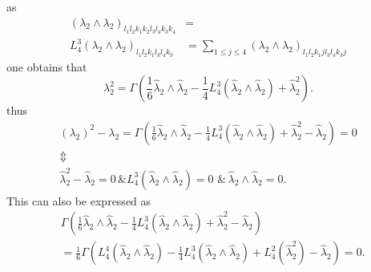 \documentclass[aps,preprint]{revtex4}%
\begin{document}
as
\begin{align}
\left(  \lambda_{2}\wedge\lambda_{2}\right)  _{l_{1}l_{2}k_{1}k_{2}l_{3}%
l_{4}k_{3}k_{4}}  &  =\\
L_{4}^{3}\left(  \lambda_{2}\wedge\lambda_{2}\right)  _{l_{1}l_{2}k_{1}%
l_{3}l_{4}k_{3}}  &  =\sum_{1\leq j\leq4}\left(  \lambda_{2}\wedge\lambda
_{2}\right)  _{l_{1}l_{2}k_{1}jl_{3}l_{4}k_{3}j}%
\end{align}
one obtains that%
\begin{equation}
\lambda_{2}^{2}=\Gamma\left(  \frac{1}{6}\hat{\lambda}_{2}\wedge\hat{\lambda
}_{2}-\frac{1}{4}L_{4}^{3}\left(  \hat{\lambda}_{2}\wedge\hat{\lambda}%
_{2}\right)  +\hat{\lambda}_{2}^{2}\right)  .
\end{equation}
thus
\begin{gather}
\left(  \lambda_{2}\right)  ^{2}-\lambda_{2}=\Gamma\left(  \frac{1}{6}%
\hat{\lambda}_{2}\wedge\hat{\lambda}_{2}-\frac{1}{4}L_{4}^{3}\left(
\hat{\lambda}_{2}\wedge\hat{\lambda}_{2}\right)  +\hat{\lambda}_{2}^{2}%
-\hat{\lambda}_{2}\right)  =0\nonumber\\
\Updownarrow\nonumber\\
\hat{\lambda}_{2}^{2}-\hat{\lambda}_{2}=0\,\&L_{4}^{3}\left(  \hat{\lambda
}_{2}\wedge\hat{\lambda}_{2}\right)  =0\,\,\&\,\hat{\lambda}_{2}\wedge
\hat{\lambda}_{2}=0.
\end{gather}
This can also be expressed as%
\begin{align}
&  \Gamma\left(  \frac{1}{6}\hat{\lambda}_{2}\wedge\hat{\lambda}_{2}-\frac
{1}{4}L_{4}^{3}\left(  \hat{\lambda}_{2}\wedge\hat{\lambda}_{2}\right)
+\hat{\lambda}_{2}^{2}-\hat{\lambda}_{2}\right) \nonumber\\
&  =\frac{1}{6}\Gamma\left(  L_{4}^{4}\left(  \hat{\lambda}_{2}\wedge
\hat{\lambda}_{2}\right)  -\frac{1}{4}L_{4}^{3}\left(  \hat{\lambda}_{2}%
\wedge\hat{\lambda}_{2}\right)  +L_{4}^{2}\left(  \hat{\lambda}_{2}%
^{2}\right)  -\hat{\lambda}_{2}\right)  =0.
\end{align}
\end{document}
